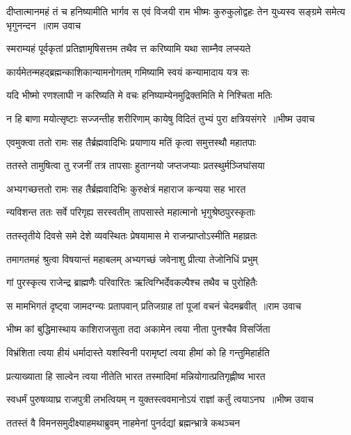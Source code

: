 \fourlineindentedshloka
{दीप्तात्मानमहं तं च हनिष्यामीति भार्गव}
{स एवं विजयी राम भीष्मः कुरुकुलोद्वहः}
{तेन युध्यस्व सङ्ग्रमे समेत्य भृगुनन्दन ॥राम उवाच}
{}


\twolineshloka
{स्मराम्यहं पूर्वकृतां प्रतिज्ञामृषिसत्तम}
{तथैव त्त करिष्यामि यथा साम्नैव लप्स्यते}


\twolineshloka
{कार्यमेतन्महद्ब्रह्मन्काशिकान्यामनोगतम्}
{गमिष्यामि स्वयं कन्यामादाय यत्र सः}


\twolineshloka
{यदि भीष्मो रणश्लाघी न करिष्यति मे वचः}
{हनिष्याम्येनमुद्रिक्तमिति मे निश्चिता मतिः}


\threelineshloka
{न हि बाणा मयोत्सृष्टाः सज्जन्तीह शरीरिणाम्}
{कायेषु विदितं तुभ्यं पुरा क्षत्रियसंगरे ॥भीष्म उवाच}
{}


\twolineshloka
{एवमुक्त्वा ततो रामः सह तैर्ब्रह्मवादिभिः}
{प्रयाणाय मतिं कृत्वा समुत्तस्थौ महातपाः}


\twolineshloka
{ततस्ते तामुषित्वा तु रजनीं तत्र तापसाः}
{हुताग्नयो जप्तजप्याः प्रतस्थुर्मञ्जिघांसया}


\twolineshloka
{अभ्यगच्छत्ततो रामः सह तैर्ब्रह्मवादिभिः}
{कुरुक्षेत्रं महाराज कन्यया सह भारत}


\twolineshloka
{न्यविशन्त ततः सर्वे परिगृह्य सरस्वतीम्}
{तापसास्ते महात्मानो भृगुश्रेष्ठपुरस्कृताः}


\twolineshloka
{ततस्तृतीये दिवसे समे देशे व्यवस्थितः}
{प्रेषयामास मे राजन्प्राप्तोऽस्मीति महाव्रतः}


\twolineshloka
{तमागतमहं श्रुत्वा विषयान्तं महाबलम्}
{अभ्यगच्छं जवेनाशु प्रीत्या तेजोनिधिं प्रभुम्}


\twolineshloka
{गां पुरस्कृत्य राजेन्द्र ब्राह्मणैः परिवारितः}
{ऋत्विग्भिर्देवकल्पैश्च तथैव च पुरोहितैः}


\threelineshloka
{स मामभिगतं दृष्ट्वा जामदग्न्यः प्रतापवान्}
{प्रतिजग्राह तां पूजां वचनं चेदमब्रवीत् ॥राम उवाच}
{}


\twolineshloka
{भीष्म कां बुद्धिमास्थाय काशिराजसुता तदा}
{अकामेन त्वया नीता पुनश्चैव विसर्जिता}


\twolineshloka
{विभ्रंशिता त्वया हीयं धर्मादास्ते यशस्विनी}
{परामृष्टां त्वया हीमां को हि गन्तुमिहार्हति}


\twolineshloka
{प्रत्याख्याता हि साल्वेन त्वया नीतेति भारत}
{तस्मादिमां मन्नियोगात्प्रतिगृह्णीष्व भारत}


\threelineshloka
{स्वधर्मं पुरुषव्याघ्र राजपुत्री लभत्वियम्}
{न युक्तस्त्ववमानोऽयं राज्ञां कर्तुं त्वयाऽनघ ॥भीष्म उवाच}
{}


\twolineshloka
{ततस्तं वै विमनसमुदीक्ष्याहमथाब्रुवम्}
{नाहमेनां पुनर्दद्यां ब्रह्मन्भ्रात्रे कथञ्चन}


